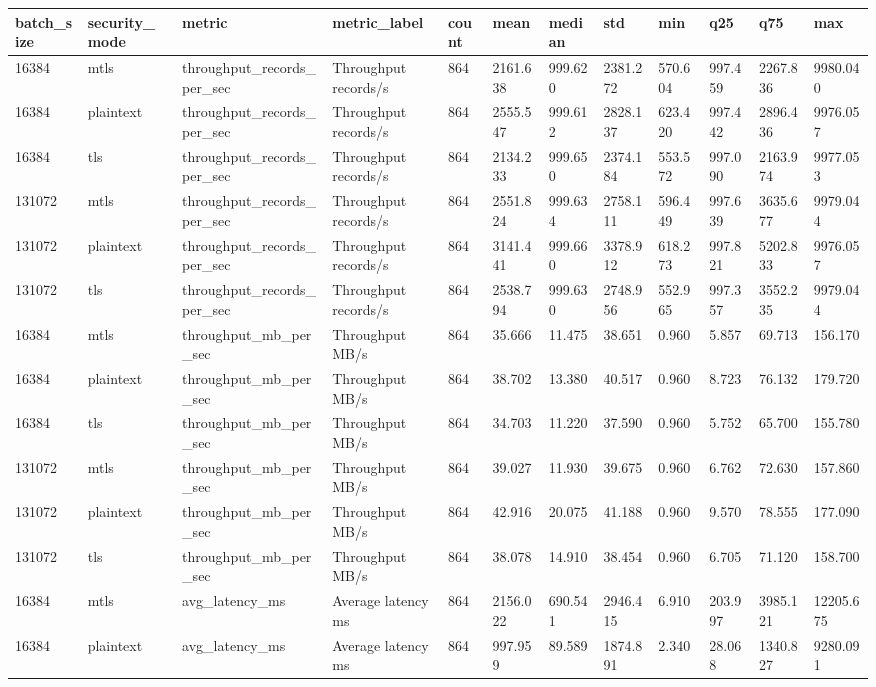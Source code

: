 \begin{longtable}{llllllllllll}
\hline
batch\_size & security\_mode & metric & metric\_label & count & mean & median & std & min & q25 & q75 & max \\
\hline
16384 & mtls & throughput\_records\_per\_sec & Throughput records/s & 864 & 2161.638 & 999.620 & 2381.272 & 570.604 & 997.459 & 2267.836 & 9980.040 \\
16384 & plaintext & throughput\_records\_per\_sec & Throughput records/s & 864 & 2555.547 & 999.612 & 2828.137 & 623.420 & 997.442 & 2896.436 & 9976.057 \\
16384 & tls & throughput\_records\_per\_sec & Throughput records/s & 864 & 2134.233 & 999.650 & 2374.184 & 553.572 & 997.090 & 2163.974 & 9977.053 \\
131072 & mtls & throughput\_records\_per\_sec & Throughput records/s & 864 & 2551.824 & 999.634 & 2758.111 & 596.449 & 997.639 & 3635.677 & 9979.044 \\
131072 & plaintext & throughput\_records\_per\_sec & Throughput records/s & 864 & 3141.441 & 999.660 & 3378.912 & 618.273 & 997.821 & 5202.833 & 9976.057 \\
131072 & tls & throughput\_records\_per\_sec & Throughput records/s & 864 & 2538.794 & 999.630 & 2748.956 & 552.965 & 997.357 & 3552.235 & 9979.044 \\
16384 & mtls & throughput\_mb\_per\_sec & Throughput MB/s & 864 & 35.666 & 11.475 & 38.651 & 0.960 & 5.857 & 69.713 & 156.170 \\
16384 & plaintext & throughput\_mb\_per\_sec & Throughput MB/s & 864 & 38.702 & 13.380 & 40.517 & 0.960 & 8.723 & 76.132 & 179.720 \\
16384 & tls & throughput\_mb\_per\_sec & Throughput MB/s & 864 & 34.703 & 11.220 & 37.590 & 0.960 & 5.752 & 65.700 & 155.780 \\
131072 & mtls & throughput\_mb\_per\_sec & Throughput MB/s & 864 & 39.027 & 11.930 & 39.675 & 0.960 & 6.762 & 72.630 & 157.860 \\
131072 & plaintext & throughput\_mb\_per\_sec & Throughput MB/s & 864 & 42.916 & 20.075 & 41.188 & 0.960 & 9.570 & 78.555 & 177.090 \\
131072 & tls & throughput\_mb\_per\_sec & Throughput MB/s & 864 & 38.078 & 14.910 & 38.454 & 0.960 & 6.705 & 71.120 & 158.700 \\
16384 & mtls & avg\_latency\_ms & Average latency ms & 864 & 2156.022 & 690.541 & 2946.415 & 6.910 & 203.997 & 3985.121 & 12205.675 \\
16384 & plaintext & avg\_latency\_ms & Average latency ms & 864 & 997.959 & 89.589 & 1874.891 & 2.340 & 28.068 & 1340.827 & 9280.091 \\

\end{longtable}
